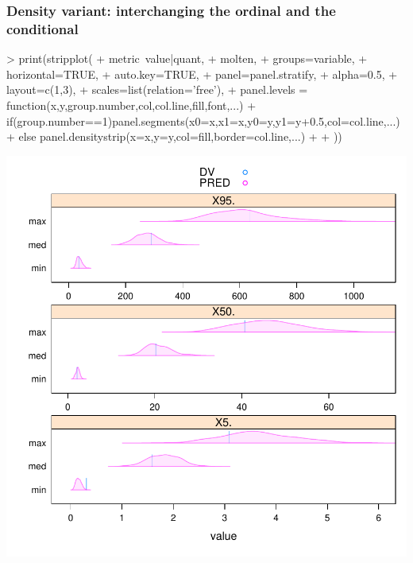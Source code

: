 \subsubsection{Density variant: interchanging the ordinal and the conditional}
\begin{Schunk}
\begin{Sinput}
> print(stripplot(
+ 	metric~value|quant,
+ 	molten,
+ 	groups=variable,
+ 	horizontal=TRUE,
+ 	auto.key=TRUE,
+ 	panel=panel.stratify,
+ 	alpha=0.5,
+ 	layout=c(1,3),
+ 	scales=list(relation='free'),
+ 	panel.levels = function(x,y,group.number,col,col.line,fill,font,...){
+ 		if(group.number==1)panel.segments(x0=x,x1=x,y0=y,y1=y+0.5,col=col.line,...)
+ 		else panel.densitystrip(x=x,y=y,col=fill,border=col.line,...)
+ 	}
+ ))
\end{Sinput}
\end{Schunk}
\includegraphics{model1-boa3}
